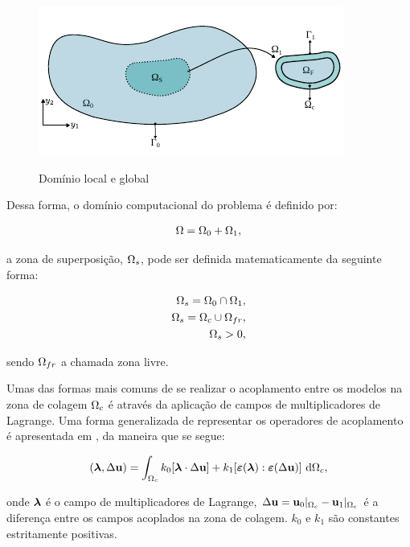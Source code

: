 \begin{figure}[!htbp]
	\caption{Domínio local e global}
	\centering 
	\includegraphics[scale=1.5,trim=0cm 0cm 0cm 0.0cm, clip=true]{Imagens/Cap6/dominioArlequin.pdf}	
	\label{fig:dominioArlequin}
\end{figure}

Dessa forma, o domínio computacional do problema é definido por:

\begin{align}
	\Omega = \Omega_0 + \Omega_1, 
\end{align}

\noindent a zona de superposição, $\Omega_s$, pode ser definida matematicamente da seguinte forma:

\begin{align}
	\Omega_s = \Omega_0 \cap \Omega_1, \\
	\Omega_s = \Omega_c \cup \Omega_{fr}, \\
	\Omega_s > 0, 
\end{align}

\noindent sendo  $\Omega_{fr}$ a chamada zona livre.

Umas das formas mais comuns de se realizar o acoplamento entre os modelos na zona de colagem $\Omega_c$ é através da aplicação de campos de multiplicadores de Lagrange. Uma forma generalizada de representar os operadores de acoplamento é apresentada em , da maneira que se segue:

\begin{align}
	(\boldsymbol{\lambda},\Delta \mathbf{u}) =  \int_{\Omega_c} k_{0}[\boldsymbol{\lambda} \cdot \Delta \mathbf{u} ] + k_{1}[\bm{\varepsilon} (\boldsymbol{\lambda}) : \bm{\varepsilon} (\Delta \mathbf{u})] \ \mathrm{d} \Omega_c,
\end{align}

\noindent onde $\boldsymbol{\lambda}$ é o campo de multiplicadores de Lagrange, $\Delta \mathbf{u} = \mathbf{u}_0 |_{\Omega_c} - \mathbf{u}_1 |_{\Omega_c}$ é a diferença entre os campos acoplados na zona de colagem. $k_{0}$ e $k_{1}$ são constantes estritamente positivas. 

